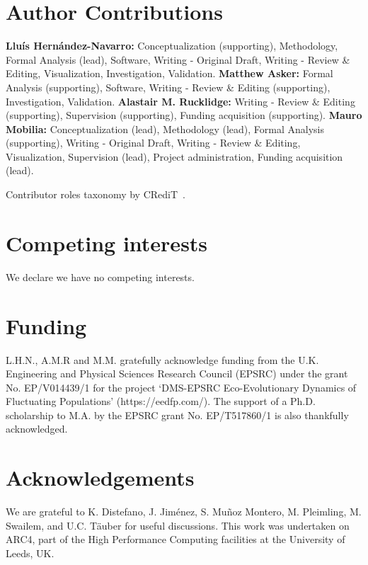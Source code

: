 \documentclass{article}
\begin{document}
\section*{Author Contributions}
{\bf Llu\'is Hern\'andez-Navarro:} Conceptualization (supporting), Methodology, Formal Analysis (lead), Software, Writing - Original Draft, Writing - Review \& Editing, Visualization, Investigation, Validation. {\bf Matthew Asker:} Formal Analysis (supporting), Software, Writing - Review \& Editing (supporting), Investigation, Validation. {\bf Alastair M. Rucklidge:} Writing - Review \& Editing (supporting), Supervision (supporting), Funding acquisition (supporting). {\bf Mauro Mobilia:} Conceptualization (lead), Methodology (lead), Formal Analysis (supporting), Writing - Original Draft, Writing - Review \& Editing,  Visualization, Supervision (lead), Project administration, Funding acquisition (lead).

Contributor roles taxonomy by CRediT~\cite{brand2015beyond}.


\section*{Competing interests}
We declare we have no competing interests.


\section*{Funding}
L.H.N., A.M.R and M.M. gratefully acknowledge funding from the U.K.
Engineering and Physical Sciences Research Council (EPSRC)
under the grant No. EP/V014439/1
for the project `DMS-EPSRC Eco-Evolutionary Dynamics of Fluctuating Populations’ (https://eedfp.com/). The support of a Ph.D. scholarship to M.A.
by the EPSRC  grant No. EP/T517860/1  is also thankfully acknowledged. 
\section*{Acknowledgements}
We are grateful to K. Distefano, J. Jim\'enez, S. Mu\~{n}oz Montero, M. Pleimling, M. Swailem, and U.C. T\"auber for useful discussions. This work was undertaken on ARC4, part of the High Performance Computing facilities at the University of Leeds, UK.






\newpage

\setcounter{figure}{0}
\renewcommand{\figurename}{Figure}
\renewcommand{\thefigure}{S\arabic{figure}}
\setcounter{equation}{0}
\renewcommand{\theequation}{S\arabic{equation}}
\end{document}
